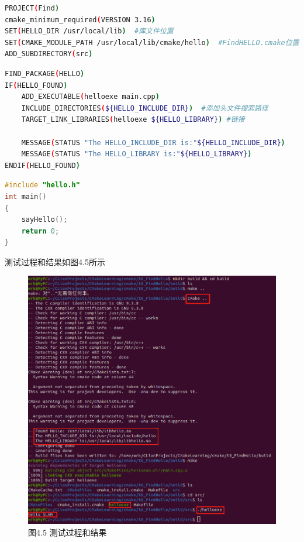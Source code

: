 \documentclass[40pt,a4paper，UTF8]{ctexart}
\begin{document}
\begin{lstlisting}[language=bash, caption=工程/CMakeLists.txt]
PROJECT(Find)
cmake_minimum_required(VERSION 3.16)
SET(HELLO_DIR /usr/local/lib)  #库文件位置
SET(CMAKE_MODULE_PATH /usr/local/lib/cmake/hello)  #FindHELLO.cmake位置
ADD_SUBDIRECTORY(src)
\end{lstlisting}


\begin{lstlisting}[language=bash, caption=src/CMakeLists.txt]
FIND_PACKAGE(HELLO)
IF(HELLO_FOUND)
	ADD_EXECUTABLE(helloexe main.cpp)
	INCLUDE_DIRECTORIES(${HELLO_INCLUDE_DIR})  #添加头文件搜索路径
	TARGET_LINK_LIBRARIES(helloexe ${HELLO_LIBRARY}) #链接
	
	MESSAGE(STATUS "The HELLO_INCLUDE_DIR is:"${HELLO_INCLUDE_DIR})
	MESSAGE(STATUS "The HELLO_LIBRARY is:"${HELLO_LIBRARY})	
ENDIF(HELLO_FOUND)
\end{lstlisting}

\begin{lstlisting}[language=C++, caption=src/CMakeLists.txt]
#include "hello.h"
int main()
{
	sayHello();
	return 0;
}
\end{lstlisting}

测试过程和结果如图4.5所示
\begin{figure}[H]
\centering
\includegraphics[width=4.8in]{ch1_4_5.png} {图4.5 测试过程和结果}
\end{figure}


\paragraph{}
\end{document}
